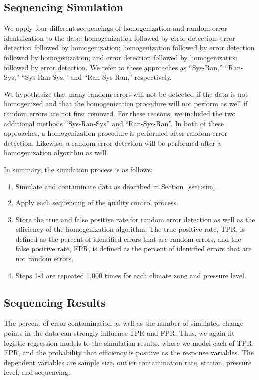 \documentclass[12pt]{article}
\begin{document}
\begin{doublespacing}
\subsection{Sequencing Simulation}

We apply four different sequencings of homogenization and random error identification to the data: homogenization followed by error detection; error detection followed by homogenization; homogenization followed by error detection followed by homogenization; and error detection followed by homogenization followed by error detection.  We refer to these approaches as ``Sys-Ran,'' ``Ran-Sys,'' ``Sys-Ran-Sys,'' and ``Ran-Sys-Ran,'' respectively.

We hypothesize that many random errors will not be detected if the data is not homogenized and that the homogenization procedure will not perform as well if random errors are not first removed.  For these reasons, we included the two additional methods ``Sys-Ran-Sys'' and ``Ran-Sys-Ran''.  In both of these approaches, a homogenization procedure is performed after random error detection.  Likewise, a random error detection will be performed after a homogenization algorithm as well.

In summary, the simulation process is as follows:

\begin{enumerate}
	\item Simulate and contaminate data as described in Section~\ref{ssec:sim}.
	\item Apply each sequencing of the quality control process.
	\item Store the true and false positive rate for random error detection as well as the efficiency of the homogenization algorithm.  The true positive rate, TPR, is defined as the percent of identified errors that are random errors, and the false positive rate, FPR, is defined as the percent of identified errors that are not random errors.
	\item Steps 1-3 are repeated 1,000 times for each climate zone and pressure level.
\end{enumerate}

\subsection{Sequencing Results}

The percent of error contamination as well as the number of simulated change points in the data can strongly influence TPR and FPR.  Thus, we again fit logistic regression models to the simulation results, where we model each of TPR, FPR, and the probability that efficiency is positive as the response variables.  The dependent variables are sample size, outlier contamination rate, station, pressure level, and sequencing.


\end{doublespacing}
\end{document}
